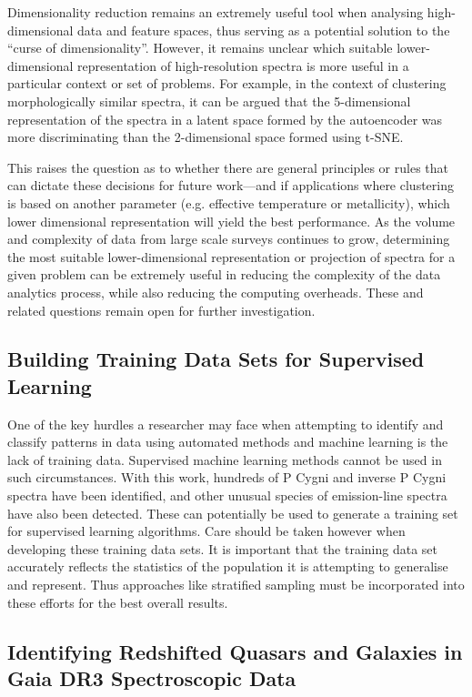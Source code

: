 Dimensionality reduction remains an extremely useful tool when analysing high-dimensional data and feature spaces, thus serving as a potential solution to the ``curse of dimensionality''. However, it remains unclear which suitable lower-dimensional representation of high-resolution spectra is more useful in a particular context or set of problems. For example, in the context of clustering morphologically similar spectra, it can be argued that the 5-dimensional representation of the spectra in a latent space formed by the autoencoder was more discriminating than the 2-dimensional space formed using t-SNE. 

This raises the question as to whether there are general principles or rules that can dictate these decisions for future work—and if applications where clustering is based on another parameter (e.g. effective temperature or metallicity), which lower dimensional representation will yield the best performance. As the volume and complexity of data from large scale surveys continues to grow, determining the most suitable lower-dimensional representation or projection of spectra for a given problem can be extremely useful in reducing the complexity of the data analytics process, while also reducing the computing overheads. These and related questions remain open for further investigation.

\subsection{Building Training Data Sets for Supervised Learning}

One of the key hurdles a researcher may face when attempting to identify and classify patterns in data using automated methods and machine learning is the lack of training data. Supervised machine learning methods cannot be used in such circumstances. With this work, hundreds of P Cygni and inverse P Cygni spectra have been identified, and other unusual species of emission-line spectra have also been detected. These can potentially be used to generate a training set for supervised learning algorithms. Care should be taken however when developing these training data sets. It is important that the training data set accurately reflects the statistics of the population it is attempting to generalise and represent. Thus approaches like stratified sampling must be incorporated into these efforts for the best overall results. 

\subsection{Identifying Redshifted Quasars and Galaxies in Gaia DR3 Spectroscopic Data}

